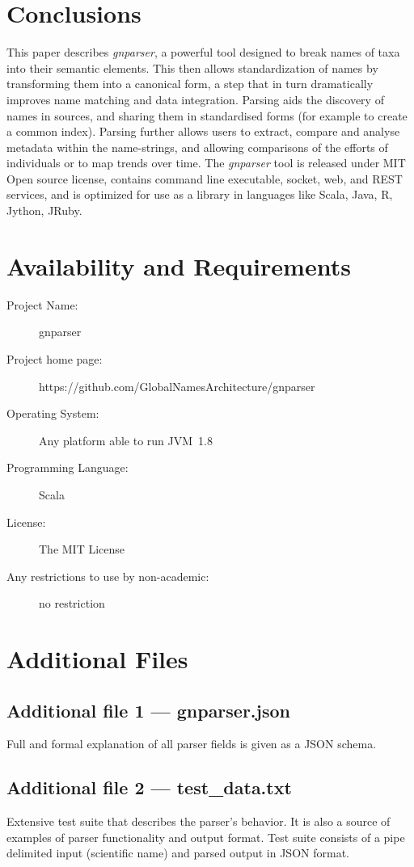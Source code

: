 \documentclass{bmcart}
\begin{document}
\section*{Conclusions}

This paper describes \textit{gnparser}, a powerful tool designed to break
names of taxa into their semantic elements. This then allows standardization
of names by transforming them into a canonical form, a step that in turn
dramatically improves name matching and data integration. Parsing aids the
discovery of names in sources, and sharing them in standardised forms (for
example to create a common index). Parsing further allows users to extract,
compare and analyse metadata within the name-strings, and allowing comparisons
of the efforts of individuals or to map trends over time. The \textit{gnparser}
tool is released under MIT Open source license, contains command line
executable, socket, web, and REST services, and is optimized for use as a
library in languages like Scala, Java, R, Jython, JRuby.

\section*{Availability and Requirements}

\begin{description}
  \item[Project Name:] gnparser
  \item[Project home page:] https://github.com/GlobalNamesArchitecture/gnparser
  \item[Operating System:] Any platform able to run JVM~1.8
  \item[Programming Language:] Scala
  \item[License:] The MIT License
  \item[Any restrictions to use by non-academic:] no restriction
\end{description}

\section*{Additional Files}

  \subsection*{Additional file 1 --- gnparser.json}
  Full and formal explanation of all parser fields is given as a JSON schema.

  \subsection*{Additional file 2 --- test\_data.txt}
  Extensive test suite that describes the parser's behavior. It is also a
  source of examples of parser functionality and output format.
  Test suite consists of a pipe delimited input (scientific name) and parsed
  output in JSON format.
\end{document}
